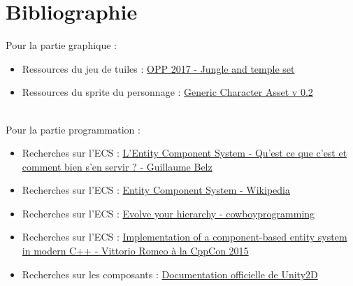 \documentclass[12pt, openany]{report}
\begin{document}
\chapter*{Bibliographie}
Pour la partie graphique :
\begin{itemize}
\item Ressources du jeu de tuiles : \href{https://openpixelproject.itch.io/opp2017jungle}{OPP 2017 - Jungle and temple set}
\item Ressources du sprite du personnage : \href{https://brullov.itch.io/generic-char-asset}{Generic Character Asset v 0.2}
\end{itemize}
~\\[1cm]
Pour la partie programmation :
\begin{itemize}
\item Recherches sur l'ECS : \href{http://guillaume.belz.free.fr/doku.php?id=ecs}{L'Entity Component System - Qu'est ce que c'est et comment bien s'en servir ? - Guillaume Belz}
\item Recherches sur l'ECS : \href{https://en.wikipedia.org/wiki/Entity_component_system}{Entity Component System - Wikipedia}
\item Recherches sur l'ECS : \href{https://cowboyprogramming.com/2007/01/05/evolve-your-heirachy/}{Evolve your hierarchy - cowboyprogramming}
\item Recherches sur l'ECS : \href{https://www.youtube.com/watch?v=NTWSeQtHZ9M}{Implementation of a component-based entity system in modern C++ - Vittorio Romeo \`a la CppCon 2015}
\item Recherches sur les composants : \href{https://docs.unity3d.com/Manual/Unity2D.html}{Documentation officielle de Unity2D}
\end{itemize}
\end{document}
